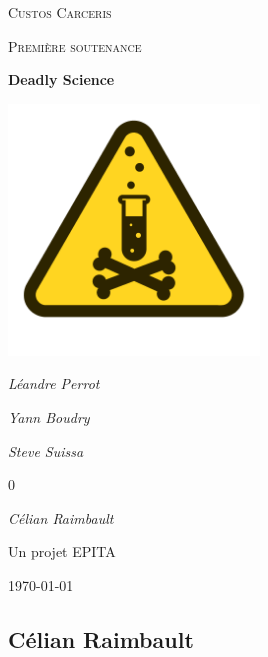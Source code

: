 \documentclass{article}
\begin{document}
\begin{titlepage}
	\centering
	{\scshape\LARGE Custos Carceris\par}
	\vspace{1cm}
	{\scshape\Large Première soutenance \par}
	\vspace{1.5cm}
	{\huge\bfseries Deadly Science\par}
	\vspace{2cm}
	\includegraphics[width=0.5\textwidth]{logo.png}\par\vspace{1cm}
	{\Large\itshape Léandre Perrot\par}
	{\Large\itshape Yann Boudry\par}
	{\Large\itshape Steve Suissa\par}0
	{\Large\itshape Célian Raimbault\par}
	\vfill
	Un projet EPITA
	\vfill
	{\large \today\par}
\end{titlepage}



\newpage
\tableofcontents



\subsection{Célian Raimbault}
\end{document}
